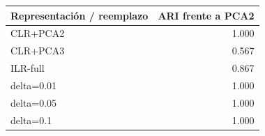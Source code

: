 \begin{tabular}{lr}
\toprule
Representación / reemplazo & ARI frente a PCA2 \\
\midrule
CLR+PCA2 & 1.000 \\
CLR+PCA3 & 0.567 \\
ILR-full & 0.867 \\
delta=0.01 & 1.000 \\
delta=0.05 & 1.000 \\
delta=0.1 & 1.000 \\
\bottomrule
\end{tabular}
